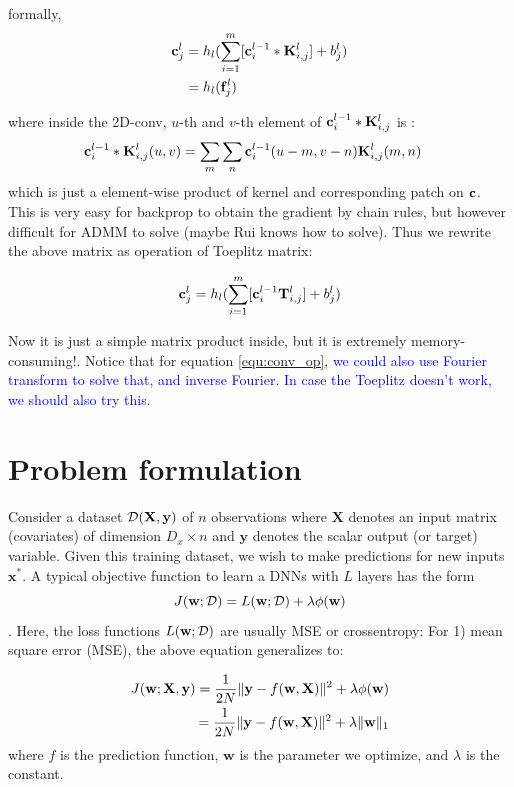 \documentclass[11pt,a4paper]{article}
\begin{document}
formally, 
\begin{align}
\mathbf{c}^l_j &= h_l(\sum^m_{i=1}[\mathbf{c}^{l-1}_i * \mathbf{K}^l_{i,j}] + b^l_j)\\
&= h_l(\mathbf{f}^l_j)
\label{equ:conv_op}
\end{align}

where inside the 2D-conv, $u$-th and $v$-th element of $\mathbf{c}^{l-1}_i * \mathbf{K}^l_{i,j}$ is :
\begin{align}
\mathbf{c}^{l-1}_i * \mathbf{K}^l_{i,j} (u,v) &= \sum_m\sum_n \mathbf{c}^{l-1}_i (u-m, v-n) \mathbf{K}^l_{i,j} (m,n)
\end{align}
which is just a element-wise product of kernel and corresponding patch on $\mathbf{c}$. This is very easy for backprop to obtain the gradient by chain rules, but however difficult for ADMM to solve (maybe Rui knows how to solve). Thus we rewrite the above matrix as operation of Toeplitz matrix:

\begin{equation}
\mathbf{c}^l_j = h_l(\sum^m_{i=1}[\mathbf{c}^{l-1}_i  \mathbf{T}^l_{i,j}] + b^l_j)
\end{equation}

Now it is just a simple matrix product inside, but it is extremely memory-consuming!. Notice that for equation \eqref{equ:conv_op}, \textcolor{blue}{we could also use Fourier transform to solve that, and inverse Fourier. In case the Toeplitz doesn't work, we should also try this}. 
\section{Problem formulation}
Consider a dataset $\mathcal{D}(\mathbf{X}, \mathbf{y})$ of $n$ observations where $\mathbf{X}$ denotes an input matrix (covariates) of dimension $D_x \times n$ and $\mathbf{y}$ denotes the scalar output (or target) variable.  Given this training dataset,  we wish to make predictions for new inputs $\mathbf{x}^*$. A typical objective function to learn a DNNs with $L$ layers has the
form 
\begin{equation}
J(\mathbf{w}; \mathcal{D}) = L(\mathbf{w}; \mathcal{D}) + \lambda \phi (\mathbf{w})
\end{equation}. 
Here, the loss functions $L(\mathbf{w}; \mathcal{D})$ are usually MSE or crossentropy:
For 1) mean square error (MSE), the above equation generalizes to:

\begin{equation}
\begin{split}
\label{eq:objective_mse}
J(\mathbf{w}; \mathbf{X}, \mathbf{y}) = \frac{1}{2N}\lVert\mathbf{y} - f(\mathbf{w}, \mathbf{X})\rVert^2 + \lambda \phi(\mathbf{w}) \\
= \frac{1}{2N}\lVert\mathbf{y} - f(\mathbf{w}, \mathbf{X})\rVert^2 + \lambda \| \mathbf{w} \|_1
\end{split}
\end{equation}
where $f$ is the prediction function, $\mathbf{w}$ is the parameter we optimize,  and $\lambda$ is the constant. 
\end{document}

